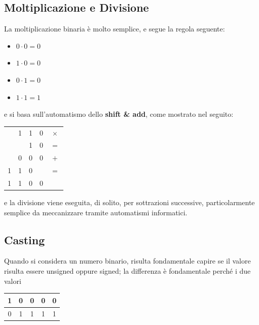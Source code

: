 \documentclass[a4paper]{extarticle}
\renewcommand\arraystretch{}
\begin{document}
\vspace{1em}
\noindent
\subsection{Moltiplicazione e Divisione}
La moltiplicazione binaria è molto semplice, e segue la regola seguente:
\begin{itemize}
    \item $0 \cdot 0 = 0$
    \item $1 \cdot 0 = 0$
    \item $0 \cdot 1 = 0$
    \item $1 \cdot 1 = 1$
\end{itemize}
e si basa sull'automatismo dello \textbf{shift \& add}, come mostrato nel seguito:

\vspace{1em}
\setlength{\tabcolsep}{4pt}
\renewcommand{\arraystretch}{1}
\begin{table}[H]
    \centering
    \begin{tabular}{ccccc}
          & 1 & 1 & 0 & $\times$\\
          &   & 1 & 0 & $=$\\
        \hline
          & 0 & 0 & 0 & $+$\\
        1 & 1 & 0 &   & $=$\\
        \hline
        1 & 1 & 0 & 0 &
    \end{tabular}
\end{table}

\noindent
e la divisione viene eseguita, di solito, per sottrazioni successive, particolarmente semplice da meccanizzare tramite automatismi informatici.

\vspace{1em}
\subsection{Casting}
Quando si considera un numero binario, risulta fondamentale capire se il valore risulta essere unsigned oppure signed; la differenza è fondamentale perché i due valori

\vspace{1em}
\setlength{\tabcolsep}{4pt}
\renewcommand{\arraystretch}{1}
\begin{table}[H]
    \centering
    \begin{tabular}{ccccc}
        1 & 0 & 0 & 0 & 0\\
        \hline
        0 & 1 & 1 & 1 & 1
    \end{tabular}
\end{table}
\end{document}
